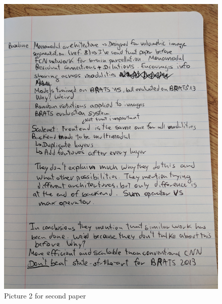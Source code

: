 \documentclass{article}
\begin{document}
\begin{figure}[h!]
\centering
\includegraphics[width=12cm]{paper2_2.jpg}
\caption{Picture 2 for second paper}
\label{fig:paper2_2}
\end{figure}
\end{document}
